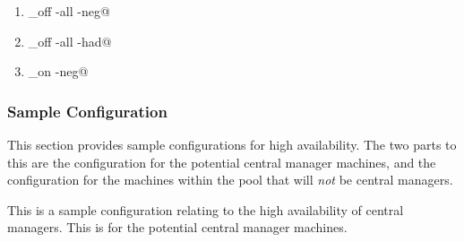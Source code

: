 \begin{enumerate}
\item \verb@condor_off -all -neg@
\item \verb@condor_off -all -had@
\item \verb@condor_on -neg@
\end{enumerate}

\subsubsection{\label{sec:HA-sample-config} Sample Configuration} 
This section provides sample configurations for high availability.
The two parts to this are the 
configuration for the potential central manager machines,
and the configuration for the
machines within the pool that will \emph{not} be
central managers.

This is a sample configuration relating to the 
high availability of central managers.
This is for the potential central manager machines.

